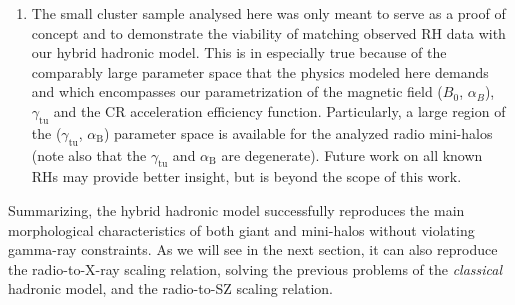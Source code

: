 \documentclass[traditabstract]{aa}
\newcommand{\rmn}{\mathrm}
\begin{document}
\begin{enumerate}
\item The small cluster sample analysed here was only meant to serve as a proof
  of concept and to demonstrate the viability of matching observed RH data with
  our hybrid hadronic model. This is in especially true because of the
  comparably large parameter space that the physics modeled here demands and
  which encompasses our parametrization of the magnetic field ($B_0$,
  $\alpha_B$), $\gamma_{\rmn{tu}}$ and the CR acceleration efficiency
  function. Particularly, a large region of the ($\gamma_{\rmn{tu}}$,
  $\alpha_{\rmn{B}}$) parameter space is available for the analyzed radio
  mini-halos (note also that the $\gamma_{\rmn{tu}}$ and $\alpha_{\rmn{B}}$ are
  degenerate). Future work on all known RHs may provide better insight, but is
  beyond the scope of this work.
\end{enumerate}
Summarizing, the hybrid hadronic model successfully reproduces the main
morphological characteristics of both giant and mini-halos without violating
gamma-ray constraints. As we will see in the next section, it can also reproduce
the radio-to-X-ray scaling relation, solving the previous problems of the
\emph{classical} hadronic model, and the radio-to-SZ scaling relation. 


\end{document}
